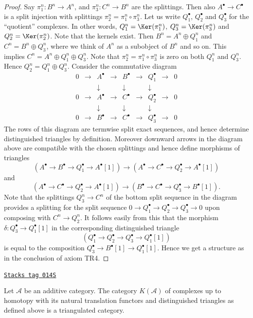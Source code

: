\begin{proof}
Say $\pi_1^n : B^n \to A^n$, and $\pi_3^n : C^n \to B^n$ are the splittings.
Then also $A^\bullet \to C^\bullet$ is a split injection with splittings
$\pi_2^n = \pi_1^n \circ \pi_3^n$. Let us write $Q_1^\bullet$, $Q_2^\bullet$
and $Q_3^\bullet$ for the ``quotient'' complexes. In other words,
$Q_1^n = \Ker(\pi_1^n)$, $Q_3^n = \Ker(\pi_3^n)$ and
$Q_2^n = \Ker(\pi_2^n)$. Note that the kernels exist. Then
$B^n = A^n \oplus Q_1^n$ and $C^n = B^n \oplus Q_3^n$, where we think of $A^n$
as a subobject of $B^n$ and so on. This implies
$C^n = A^n \oplus Q_1^n \oplus Q_3^n$. Note that
$\pi_2^n = \pi_1^n \circ \pi_3^n$ is zero on both $Q_1^n$ and $Q_3^n$. Hence
$Q_2^n = Q_1^n \oplus Q_3^n$. Consider the commutative diagram
$$
\begin{matrix}
0 & \to & A^\bullet & \to & B^\bullet & \to & Q_1^\bullet & \to & 0 \\
  &     & \downarrow &     & \downarrow &     & \downarrow  & \\
0 & \to & A^\bullet & \to & C^\bullet & \to & Q_2^\bullet & \to & 0 \\
  &     & \downarrow &     & \downarrow &     & \downarrow  & \\
0 & \to & B^\bullet & \to & C^\bullet & \to & Q_3^\bullet & \to & 0
\end{matrix}
$$
The rows of this diagram are termwise split exact sequences, and
hence determine distinguished triangles by
definition. Moreover downward arrows in the diagram above
are compatible with the chosen splittings and hence
define morphisms of triangles
$$
(A^\bullet \to B^\bullet \to Q_1^\bullet \to A^\bullet[1])
\longrightarrow
(A^\bullet \to C^\bullet \to Q_2^\bullet \to A^\bullet[1])
$$
and
$$
(A^\bullet \to C^\bullet \to Q_2^\bullet \to A^\bullet[1])
\longrightarrow
(B^\bullet \to C^\bullet \to Q_3^\bullet \to B^\bullet[1]).
$$
Note that the splittings $Q_3^n \to C^n$
of the bottom split sequence in the diagram provides a splitting
for the split sequence
$0 \to Q_1^\bullet \to Q_2^\bullet \to Q_3^\bullet \to 0$
upon composing with $C^n \to Q_2^n$. It follows easily from this
that the morphism $\delta : Q_3^\bullet \to Q_1^\bullet[1]$
in the corresponding distinguished triangle
$$
(Q_1^\bullet \to Q_2^\bullet \to Q_3^\bullet \to Q_1^\bullet[1])
$$
is equal to the composition $Q_3^\bullet \to B^\bullet[1] \to Q_1^\bullet[1]$.
Hence we get a structure as in the conclusion of axiom TR4.
\end{proof}

\begin{proposition}
\label{derived-proposition-homotopy-category-triangulated}
\href{https://stacks.math.columbia.edu/tag/014S}{\texttt{Stacks tag 014S}}

Let $\mathcal{A}$ be an additive category.
The category $K(\mathcal{A})$ of complexes up to
homotopy with its natural translation functors
and distinguished triangles as defined above
is a triangulated category.
\end{proposition}

